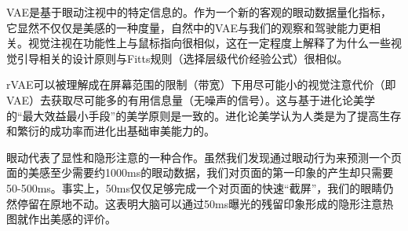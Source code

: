VAE是基于眼动注视中的特定信息的。作为一个新的客观的眼动数据量化指标，它显然不仅仅是美感的一种度量，自然中的VAE与我们的观察和驾驶能力更相关。视觉注视在功能性上与鼠标指向很相似，这在一定程度上解释了为什么一些视觉引导相关的设计原则与Fitts规则（选择层级代价经验公式）\cite{MacKenzie1992}很相似。

rVAE可以被理解成在屏幕范围的限制（带宽）下用尽可能小的视觉注意代价（即VAE）去获取尽可能多的有用信息量（无噪声的信号）。这与基于进化论美学\cite{Shimamura2012}的“最大效益最小手段”\cite{Hekkert2006}的美学原则是一致的。进化论美学认为人类是为了提高生存和繁衍的成功率而进化出基础审美能力的。

眼动代表了显性和隐形注意的一种合作。虽然我们发现通过眼动行为来预测一个页面的美感至少需要约1000ms的眼动数据，我们对页面的第一印象的产生却只需要50-500ms\cite{Lindgaard2006}。事实上，50ms仅仅足够完成一个对页面的快速“截屏”，我们的眼睛仍然停留在原地不动。这表明大脑可以通过50ms曝光的残留印象形成的隐形注意热图就作出美感的评价。
